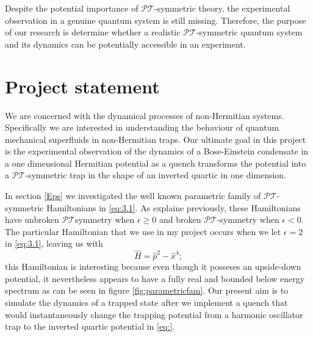 \documentclass[12pt, a4paper]{report}
\newcommand\PT{\(\mathcal{PT}\)}
\begin{document}
Despite the potential importance of \PT-symmetric theory, the experimental observation in a genuine quantum system is still missing\cite{Cartarius}.
Therefore, the purpose of our research is determine whether a realistic \PT-symmetric quantum system and its dynamics can be potentially accessible in an experiment. 





\chapter{Project statement}\label{MINE}
We are concerned with the dynamical processes of non-Hermitian systems. Specifically we are interested in understanding the behaviour of quantum mechanical superfluids in non-Hermitian traps. Our ultimate goal in this project is the experimental observation of the dynamics of a Bose-Einstein condensate in a one dimensional Hermitian potential as a quench transforms the potential into a \PT-symmetric trap in the shape of an inverted quartic in one dimension.

In section \ref{Eps} we investigated the well known parametric family of \PT-symmetric Hamiltonians in \ref{eq:3.1}. As explaine previously, these Hamiltonians have unbroken \PT\:symmetry when $\epsilon \geq 0$ and broken \PT-symmetry when $\epsilon < 0$. The particular Hamiltonian that we use in my project occurs when we let $\epsilon = 2$ in \ref{eq:3.1}, leaving us with 
\begin{equation}\label{eq:}
\hat{H} = \hat{p}^2 - \hat{x}^{4};
\end{equation}
this Hamiltonian is interesting because even though it posseses an upside-down potential, it nevertheless appears to have a fully real and bounded below energy spectrum\cite{UpsideDownPotentials} as can be seen in figure \ref{fig:parametricfam}. Our present aim is to simulate the dynamics of a trapped state after we implement a quench that would instantaneously change the trapping potential from a harmonic oscillator trap to the inverted quartic potential in \ref{eq:}.
\end{document}
